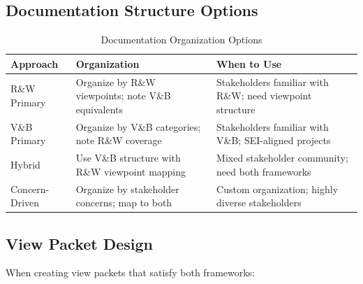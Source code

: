 \documentclass[11pt]{article}
\begin{document}
\subsection{Documentation Structure Options}

\begin{longtable}{@{}L{3.4cm} L{3.8cm} L{5.3cm}@{}}
\caption{Documentation Organization Options} \\
\toprule
\textbf{Approach} & \textbf{Organization} & \textbf{When to Use} \\
\midrule
\endfirsthead
\bottomrule
\endlastfoot
R\&W Primary & Organize by R\&W viewpoints; note V\&B equivalents & Stakeholders familiar with R\&W; need viewpoint structure \\
V\&B Primary & Organize by V\&B categories; note R\&W coverage & Stakeholders familiar with V\&B; SEI-aligned projects \\
Hybrid & Use V\&B structure with R\&W viewpoint mapping & Mixed stakeholder community; need both frameworks \\
Concern-Driven & Organize by stakeholder concerns; map to both & Custom organization; highly diverse stakeholders \\
\end{longtable}

\subsection{View Packet Design}

When creating view packets that satisfy both frameworks:
\end{document}
